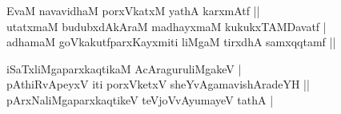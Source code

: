 \begin{entry}
\begin{shl}
EvaM navavidhaM porxVkatxM yathA karxmAtf ||\\[2pt]
utatxmaM budubxdAkAraM madhayxmaM kukukxTAMDavatf |\\[2pt]
adhamaM goVkakutfparxKayxmiti liMgaM tirxdhA samxqqtamf ||\\[-1pt]
\end{shl}
\medskip
{}
\smallskip
{}
\medskip
\begin{shl}
iSaTxliMgaparxkaqtikaM AcAraguruliMgakeV |\\[2pt]
pAthiRvApeyxV iti porxVketxV sheYvAgamavishAradeYH ||\\[2pt]
pArxNaliMgaparxkaqtikeV teVjoVvAyumayeV tathA |
\end{shl}


\end{entry}
